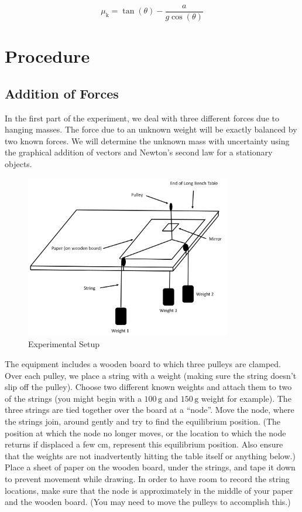 \begin{equation}
\mu_\text{k} = \tan(\theta)-\frac{a}{g \cos(\theta)}
\end{equation}

\section{Procedure}

\subsection{Addition of Forces}

In the first part of the experiment, we deal with three different forces due to hanging masses. The force due to an unknown weight will be exactly balanced by two known forces. We will determine the unknown mass with uncertainty using the graphical addition of vectors and Newton's second law for a stationary objects. \begin{figure}[h]
    \begin{center}
        \includegraphics[width=0.8\textwidth]{./Exp1-4/pic/image14.jpg}
    \end{center}
    \caption{Experimental Setup}
    \label{fig:setup}
\end{figure}

The equipment includes a wooden board to which three pulleys are clamped. Over each pulley, we place a string with a weight (making sure the string doesn't slip off the pulley). Choose two different known weights and attach them to two of the strings (you might begin with a $100\,\mathrm{g}$ and $150\,\mathrm{g}$ weight for example). The three strings are tied together over the board at a ``node''. Move the node, where the strings join, around gently and try to find the equilibrium position. (The position at which the node no longer moves, or the location to which the node returns if displaced a few cm, represent this equilibrium position. Also ensure that the weights are not inadvertently hitting the table itself or anything below.)  Place a sheet of paper on the wooden board, under the strings, and tape it down to prevent movement while drawing. In order to have room to record the string locations, make sure that the node is approximately in the middle of your paper and the wooden board. (You may need to move the pulleys to accomplish this.) \myskip

